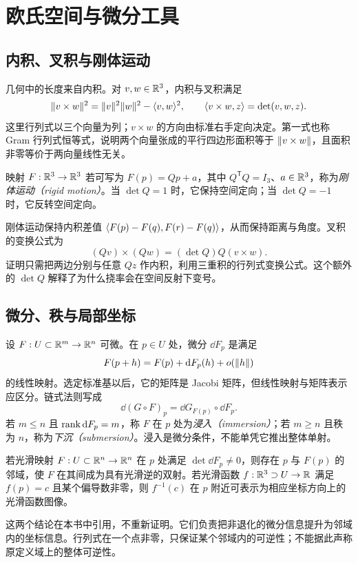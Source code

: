 \setcounter{chapter}{0} %
\chapter{欧氏空间与微分工具}
\label{chap:dg-tools}

\section{内积、叉积与刚体运动}
几何中的长度来自内积。对 $v,w\in\mathbb R^3$，内积与叉积满足
\[
 \lVert v\times w\rVert^2=\lVert v\rVert^2\lVert w\rVert^2-\langle v,w\rangle^2,
 \qquad \langle v\times w,z\rangle=\det(v,w,z).
\]
这里行列式以三个向量为列；$v\times w$ 的方向由标准右手定向决定。第一式也称 Gram 行列式恒等式，说明两个向量张成的平行四边形面积等于 $\lVert v\times w\rVert$，且面积非零等价于两向量线性无关。

\begin{definition}[欧氏刚体运动]
映射 $F:\mathbb R^3\to\mathbb R^3$ 若可写为 $F(p)=Qp+a$，其中 $Q^{\mathsf T}Q=I_3$、$a\in\mathbb R^3$，称为\emph{刚体运动（rigid motion）}。当 $\det Q=1$ 时，它保持空间定向；当 $\det Q=-1$ 时，它反转空间定向。
\end{definition}
刚体运动保持内积差值 $\langle F(p)-F(q),F(r)-F(q)\rangle$，从而保持距离与角度。叉积的变换公式为
\[
 (Qv)\times(Qw)=(\det Q)Q(v\times w).
\]
证明只需把两边分别与任意 $Qz$ 作内积，利用三重积的行列式变换公式。这个额外的 $\det Q$ 解释了为什么挠率会在空间反射下变号。

\section{微分、秩与局部坐标}
设 $F:U\subset\mathbb R^m\to\mathbb R^n$ 可微。在 $p\in U$ 处，微分 $\dd F_p$ 是满足
\[
 F(p+h)=F(p)+\mathop{}\!\mathrm d F_p(h)+o(\lVert h\rVert)
\]
的线性映射。选定标准基以后，它的矩阵是 Jacobi 矩阵，但线性映射与矩阵表示应区分。链式法则写成
\begin{equation}
 \dd(G\circ F)_p=\dd G_{F(p)}\circ\dd F_p.
 \label{eq:dg-chain}
\end{equation}
若 $m\le n$ 且 $\operatorname{rank}\mathop{}\!\mathrm d F_p=m$，称 $F$ 在 $p$ 处为\emph{浸入（immersion）}；若 $m\ge n$ 且秩为 $n$，称为\emph{下沉（submersion）}。浸入是微分条件，不能单凭它推出整体单射。

\begin{theorem}
若光滑映射 $F:U\subset\mathbb R^n\to\mathbb R^n$ 在 $p$ 处满足 $\det\dd F_p\ne0$，则存在 $p$ 与 $F(p)$ 的邻域，使 $F$ 在其间成为具有光滑逆的双射。若光滑函数 $f:\mathbb R^3\supset U\to\mathbb R$ 满足 $f(p)=c$ 且某个偏导数非零，则 $f^{-1}(c)$ 在 $p$ 附近可表示为相应坐标方向上的光滑函数图像。
\label{thm:dg-ift}
\end{theorem}
这两个结论在本书中引用，不重新证明。它们负责把非退化的微分信息提升为邻域内的坐标信息。行列式在一个点非零，只保证某个邻域内的可逆性；不能据此声称原定义域上的整体可逆性。

